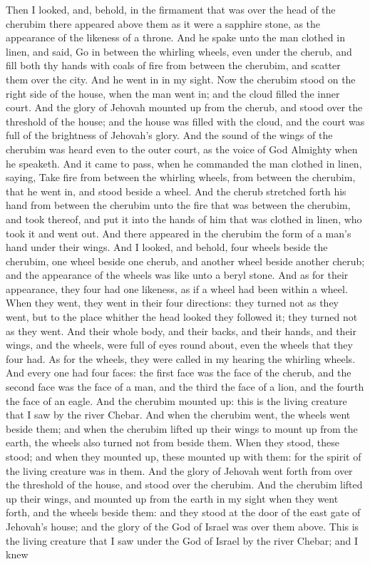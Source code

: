 Then I looked, and, behold, in the firmament that was over the head of the cherubim there appeared above them as it were a sapphire stone, as the appearance of the likeness of a throne. And he spake unto the man clothed in linen, and said, Go in between the whirling wheels, even under the cherub, and fill both thy hands with coals of fire from between the cherubim, and scatter them over the city. And he went in in my sight. Now the cherubim stood on the right side of the house, when the man went in; and the cloud filled the inner court. And the glory of Jehovah mounted up from the cherub, and stood over the threshold of the house; and the house was filled with the cloud, and the court was full of the brightness of Jehovah’s glory. And the sound of the wings of the cherubim was heard even to the outer court, as the voice of God Almighty when he speaketh. And it came to pass, when he commanded the man clothed in linen, saying, Take fire from between the whirling wheels, from between the cherubim, that he went in, and stood beside a wheel. And the cherub stretched forth his hand from between the cherubim unto the fire that was between the cherubim, and took thereof, and put it into the hands of him that was clothed in linen, who took it and went out. And there appeared in the cherubim the form of a man’s hand under their wings.  And I looked, and behold, four wheels beside the cherubim, one wheel beside one cherub, and another wheel beside another cherub; and the appearance of the wheels was like unto a beryl stone. And as for their appearance, they four had one likeness, as if a wheel had been within a wheel. When they went, they went in their four directions: they turned not as they went, but to the place whither the head looked they followed it; they turned not as they went. And their whole body, and their backs, and their hands, and their wings, and the wheels, were full of eyes round about, even the wheels that they four had. As for the wheels, they were called in my hearing the whirling wheels. And every one had four faces: the first face was the face of the cherub, and the second face was the face of a man, and the third the face of a lion, and the fourth the face of an eagle.  And the cherubim mounted up: this is the living creature that I saw by the river Chebar. And when the cherubim went, the wheels went beside them; and when the cherubim lifted up their wings to mount up from the earth, the wheels also turned not from beside them. When they stood, these stood; and when they mounted up, these mounted up with them: for the spirit of the living creature was in them.  And the glory of Jehovah went forth from over the threshold of the house, and stood over the cherubim. And the cherubim lifted up their wings, and mounted up from the earth in my sight when they went forth, and the wheels beside them: and they stood at the door of the east gate of Jehovah’s house; and the glory of the God of Israel was over them above.  This is the living creature that I saw under the God of Israel by the river Chebar; and I knew 